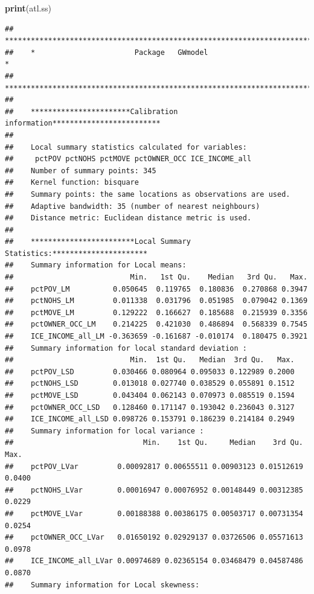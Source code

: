 \documentclass[
]{book}
\newenvironment{Shaded}{\begin{snugshade}}{\end{snugshade}}
\newcommand{\FunctionTok}[1]{\textcolor[rgb]{0.13,0.29,0.53}{\textbf{#1}}}
\newcommand{\NormalTok}[1]{#1}
\begin{document}
\begin{Shaded}
\begin{Highlighting}[]
\FunctionTok{print}\NormalTok{(atl.ss)}
\end{Highlighting}
\end{Shaded}

\begin{verbatim}
##    ***********************************************************************
##    *                       Package   GWmodel                             *
##    ***********************************************************************
## 
##    ***********************Calibration information*************************
## 
##    Local summary statistics calculated for variables:
##     pctPOV pctNOHS pctMOVE pctOWNER_OCC ICE_INCOME_all
##    Number of summary points: 345
##    Kernel function: bisquare 
##    Summary points: the same locations as observations are used.
##    Adaptive bandwidth: 35 (number of nearest neighbours)
##    Distance metric: Euclidean distance metric is used.
## 
##    ************************Local Summary Statistics:**********************
##    Summary information for Local means:
##                           Min.   1st Qu.    Median   3rd Qu.   Max.
##    pctPOV_LM          0.050645  0.119765  0.180836  0.270868 0.3947
##    pctNOHS_LM         0.011338  0.031796  0.051985  0.079042 0.1369
##    pctMOVE_LM         0.129222  0.166627  0.185688  0.215939 0.3356
##    pctOWNER_OCC_LM    0.214225  0.421030  0.486894  0.568339 0.7545
##    ICE_INCOME_all_LM -0.363659 -0.161687 -0.010174  0.180475 0.3921
##    Summary information for local standard deviation :
##                           Min.  1st Qu.   Median  3rd Qu.   Max.
##    pctPOV_LSD         0.030466 0.080964 0.095033 0.122989 0.2000
##    pctNOHS_LSD        0.013018 0.027740 0.038529 0.055891 0.1512
##    pctMOVE_LSD        0.043404 0.062143 0.070973 0.085519 0.1594
##    pctOWNER_OCC_LSD   0.128460 0.171147 0.193042 0.236043 0.3127
##    ICE_INCOME_all_LSD 0.098726 0.153791 0.186239 0.214184 0.2949
##    Summary information for local variance :
##                              Min.    1st Qu.     Median    3rd Qu.   Max.
##    pctPOV_LVar         0.00092817 0.00655511 0.00903123 0.01512619 0.0400
##    pctNOHS_LVar        0.00016947 0.00076952 0.00148449 0.00312385 0.0229
##    pctMOVE_LVar        0.00188388 0.00386175 0.00503717 0.00731354 0.0254
##    pctOWNER_OCC_LVar   0.01650192 0.02929137 0.03726506 0.05571613 0.0978
##    ICE_INCOME_all_LVar 0.00974689 0.02365154 0.03468479 0.04587486 0.0870
##    Summary information for Local skewness:

\end{verbatim}
\end{document}
